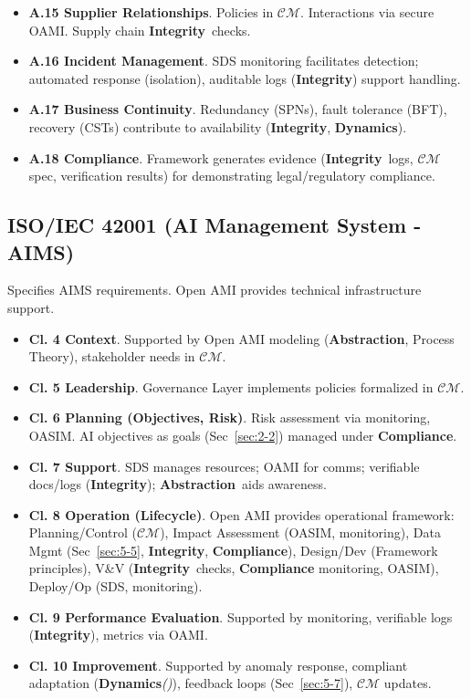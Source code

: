\documentclass[12pt,a4paper]{report}
\renewcommand{\citep}[1]{\textit{\scriptsize{(\cite{#1})}}}
\newcommand{\Integrity}{\textbf{Integrity}}
\newcommand{\Abstraction}{\textbf{Abstraction}}
\newcommand{\Dynamics}{\textbf{Dynamics}}
\begin{document}
\begin{itemize}
		\item \textbf{A.15 Supplier Relationships}. Policies in $\mathcal{CM}$. Interactions via secure OAMI. Supply chain \Integrity\ checks.
		\item \textbf{A.16 Incident Management}. SDS monitoring facilitates detection; automated response (isolation), auditable logs (\Integrity) support handling.
		\item \textbf{A.17 Business Continuity}. Redundancy (SPNs), fault tolerance (BFT), recovery (CSTs) contribute to availability (\Integrity, \Dynamics).
		\item \textbf{A.18 Compliance}. Framework generates evidence (\Integrity\ logs, $\mathcal{CM}$ spec, verification results) for demonstrating legal/regulatory compliance.
	\end{itemize}
	
	\subsection{ISO/IEC 42001 (AI Management System - AIMS)}
	\label{app:compmap_iso42001}
	
	Specifies AIMS requirements. Open AMI provides technical infrastructure support.
	
	\begin{itemize}
		\item \textbf{Cl. 4 Context}. Supported by Open AMI modeling (\Abstraction, Process Theory), stakeholder needs in $\mathcal{CM}$.
		\item \textbf{Cl. 5 Leadership}. Governance Layer implements policies formalized in $\mathcal{CM}$.
		\item \textbf{Cl. 6 Planning (Objectives, Risk)}. Risk assessment via monitoring, OASIM. AI objectives as goals (Sec~\ref{sec:2-2}) managed under \textbf{Compliance}.
		\item \textbf{Cl. 7 Support}. SDS manages resources; OAMI for comms; verifiable docs/logs (\Integrity); \Abstraction\ aids awareness.
		\item \textbf{Cl. 8 Operation (Lifecycle)}. Open AMI provides operational framework: Planning/Control ($\mathcal{CM}$), Impact Assessment (OASIM, monitoring), Data Mgmt (Sec~\ref{sec:5-5}, \Integrity, \textbf{Compliance}), Design/Dev (Framework principles), V\&V (\Integrity\ checks, \textbf{Compliance} monitoring, OASIM), Deploy/Op (SDS, monitoring).
		\item \textbf{Cl. 9 Performance Evaluation}. Supported by monitoring, verifiable logs (\Integrity), metrics via OAMI.
		\item \textbf{Cl. 10 Improvement}. Supported by anomaly response, compliant adaptation (\Dynamics \citep{Wang2024ContinualLearningSurvey}), feedback loops (Sec~\ref{sec:5-7}), $\mathcal{CM}$ updates.
	\end{itemize}
	
\end{document}
